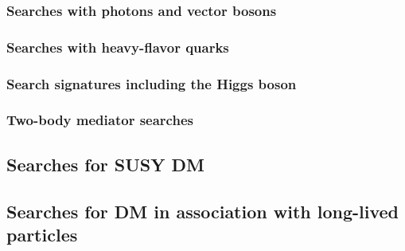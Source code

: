 \subsubsection{Searches with photons and vector bosons}

\subsubsection{Searches with heavy-flavor quarks}

\subsubsection{Search signatures including the Higgs boson}

\subsubsection{Two-body mediator searches}

\subsection{Searches for SUSY DM}
\label{sec:results_SUSYSearches}

\subsection{Searches for DM in association with long-lived particles}
\label{sec:results_LLPSearches}


%
%
%
%
%


%
%
%
%
%

